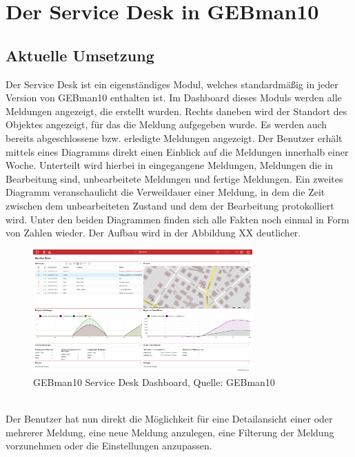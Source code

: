 
\section{Der Service Desk in GEBman10}

\subsection{Aktuelle Umsetzung}
\noindent
Der Service Desk  ist ein eigenständiges Modul, welches standardmäßig in jeder Version von GEBman10 enthalten ist. Im Dashboard dieses Moduls werden alle Meldungen angezeigt, die erstellt wurden. Rechts daneben wird der Standort des Objektes angezeigt, für das die Meldung aufgegeben wurde. Es werden auch bereits abgeschlossene bzw. erledigte Meldungen angezeigt. Der Benutzer erhält mittels eines Diagramms direkt einen Einblick auf die Meldungen innerhalb einer Woche. Unterteilt wird hierbei in eingegangene Meldungen, Meldungen die in Bearbeitung sind, unbearbeitete Meldungen und fertige Meldungen. Ein zweites Diagramm veranschaulicht die Verweildauer einer Meldung, in dem die Zeit zwischen dem unbearbeiteten Zustand und dem der Bearbeitung protokolliert wird. Unter den beiden Diagrammen finden sich alle Fakten noch einmal in Form von Zahlen wieder. Der Aufbau wird in der Abbildung XX deutlicher. 

\begin{figure}[h!]
\centering
	\includegraphics[width=0.75\textwidth]{Abbildungen/GEBman.png}
	\caption[GEBman10 Service Desk Dashboard]{GEBman10 Service Desk Dashboard, Quelle: 
	GEBman10}
	\label{fig:ITIL_Lebenyzyklus}
\end{figure}
\\
\noindent
Der Benutzer hat nun direkt die Möglichkeit für eine Detailansicht einer oder mehrerer Meldung, eine neue Meldung anzulegen, eine Filterung der Meldung vorzunehmen oder die Einstellungen anzupassen.

